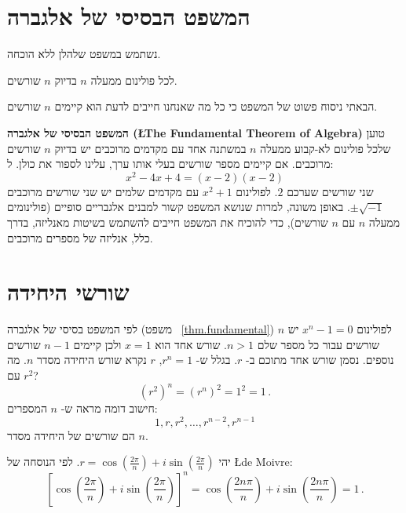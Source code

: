 
\section{המשפט הבסיסי של אלגברה}\label{s.fundamental}

נשתמש במשפט שלהלן ללא הוכחה.

\begin{theorem}\label{thm.fundamental}
לכל פולינום ממעלה 
$n$
בדיוק 
$n$
שורשים.
\end{theorem}
הבאתי ניסוח פשוט של המשפט כי כל מה שאנחנו חייבים לדעת הוא קיימים
$n$
שורשים.

\begin{advanced}
\textbf{המשפט הבסיסי של אלגברה (\L{The Fundamental Theorem of Algebra})}
טוען שלכל פולינום לא-קבוע ממעלה 
$n$
במשתנה אחד עם מקדמים מרוכבים יש בדיוק 
$n$
שורשים מרוכבים. אם קיימים מספר שורשים בעלי אותו ערך, עלינו לספור את כולן. ל:
\[
x^2-4x+4=(x-2)(x-2)
\]
שני שורשים שערכם
$2$.
לפולינום 
$x^2+1$
עם מקדמים שלמים יש שני שורשים מרוכבים
$\pm\sqrt{-1}$.
באופן משונה, למרות שנושא המשפט קשור למבנים אלגבריים סופיים (פולינומים ממעלה
$n$
עם
$n$
שורשים), כדי להוכיח את המשפט חייבים להשתמש בשיטות מאנליזה, בדרך כלל, אנליזה של מספרים מרוכבים.
\end{advanced}


\section{שורשי היחידה}\label{s.roots}

לפי המשפט בסיסי של אלגברה (משפט~%
\ref{thm.fundamental})
לפולינום
$x^{n}-1=0$
יש 
$n$
שורשים עבור כל מספר שלם
$n>	 1$.
שורש אחד הוא
$x=1$
ולכן קיימים
$n-1$
שורשים נוספים. נסמן שורש אחד מתוכם ב-%
$r$.
בגלל ש-%
$r^{n}=1$,
$r$
נקרא שורש היחידה מסדר
$n$.
מה עם
$r^2$?
\[
(r^2)^n=(r^{n})^2=1^2=1\,.
\]
חישוב דומה מראה ש-%
$n$
המספרים:
\[
1, r, r^2, \ldots, r^{n-2}, r^{n-1}
\]
הם שורשים של היחידה מסדר
$n$.
\begin{advanced}
יהי
$r=\cos \left(\frac{2\pi}{n}\right) + i\sin  \left(\frac{2\pi}{n}\right)$.
לפי הנוסחה של
\L{de Moivre}:
\[
\left[\cos \left(\frac{2\pi}{n}\right) + i\sin  \left(\frac{2\pi}{n}\right)\right]^{n}=
\cos \left(\frac{2 n\pi}{n}\right) + i\sin  \left(\frac{2 n\pi}{n}\right)= 1\,.
\]
\vspace{-2ex}
\end{advanced}

